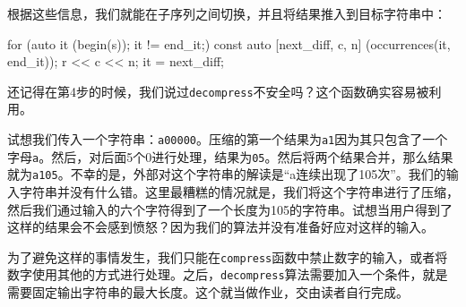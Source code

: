 根据这些信息，我们就能在子序列之间切换，并且将结果推入到目标字符串中：

\begin{codebox}[cpp]
for (auto it (begin(s)); it != end_it;) {
    const auto [next_diff, c, n] (occurrences(it, end_it));
    r << c << n;
    it = next_diff;
}
\end{codebox}


还记得在第4步的时候，我们说过\texttt{decompress}不安全吗？这个函数确实容易被利用。

试想我们传入一个字符串：\texttt{a00000}。压缩的第一个结果为\texttt{a1}因为其只包含了一个字母\texttt{a}。然后，对后面5个0进行处理，结果为\texttt{05}。然后将两个结果合并，那么结果就为\texttt{a105}。不幸的是，外部对这个字符串的解读是“a连续出现了105次”。我们的输入字符串并没有什么错。这里最糟糕的情况就是，我们将这个字符串进行了压缩，然后我们通过输入的六个字符得到了一个长度为105的字符串。试想当用户得到了这样的结果会不会感到愤怒？因为我们的算法并没有准备好应对这样的输入。

为了避免这样的事情发生，我们只能在\texttt{compress}函数中禁止数字的输入，或者将数字使用其他的方式进行处理。之后，\texttt{decompress}算法需要加入一个条件，就是需要固定输出字符串的最大长度。这个就当做作业，交由读者自行完成。



